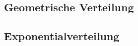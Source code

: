 \documentclass[12pt, a4paper]{scrreprt}
\begin{document}
\begin{figure}[H]
  \subsection{Geometrische Verteilung}
\end{figure}

\begin{figure}[H]
  \subsection{Exponentialverteilung}
\end{figure}


\clearpage
{}%

\end{document}
